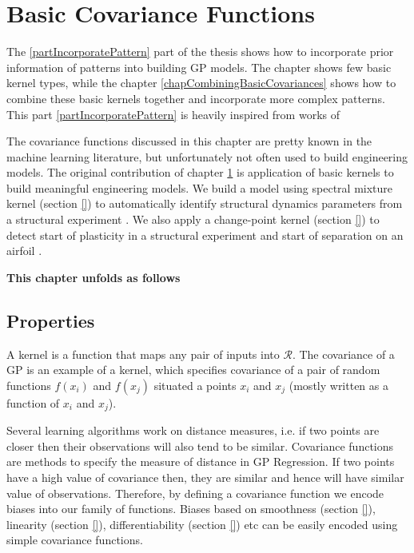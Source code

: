 \chapter{Basic Covariance Functions}
\label{chapBasicCovarianceKernels}
The \ref{partIncorporatePattern} part of the thesis shows how to incorporate prior information of patterns into building GP models. The chapter \cite{chapBasicCovarianceKernels} shows few basic kernel types, while the chapter \ref{chapCombiningBasicCovariances} shows how to combine these basic kernels together and incorporate more complex patterns. This part \ref{partIncorporatePattern} is heavily inspired from works of \cite{duvenaud-thesis-2014, wilson2014thesis, lloyd2014automatic, durrande2001etude} 

The covariance functions discussed in this chapter are pretty known in the machine learning literature, but unfortunately not often used to build engineering models. The original contribution of chapter \ref{chapBasicCovarianceKernels} is application of basic kernels to build meaningful engineering models. We build a model using spectral mixture kernel (section \ref{}) to automatically identify structural dynamics parameters from a structural experiment \cite{chiplunkar2017operational}. We also apply a change-point kernel (section \ref{}) to detect start of plasticity in a structural experiment and start of separation on an airfoil \cite{chiplunkar:hal-01555401}.  

\textbf{This chapter unfolds as follows}

\section{Properties}\label{secPropertiesOfCovariance}
A kernel is a function that maps any pair of inputs into \(\mathcal{R}\). The covariance of a GP is an example of a kernel, which specifies covariance of a pair of random functions \(f(x_{i})\) and \(f(x_{j})\) situated a points \(x_{i}\) and \(x_{j}\) (mostly written as a function of \(x_{i}\) and \(x_{j}\)). 

Several learning algorithms work on distance measures, i.e. if two points are closer then their observations will also tend to be similar. Covariance functions are methods to specify the measure of distance in GP Regression. If two points have a high value of covariance then, they are similar and hence will have similar value of observations. Therefore, by defining a covariance function we encode biases into our family of functions. Biases based on smoothness (section \ref{}), linearity (section \ref{}), differentiability (section \ref{}) etc can be easily encoded using simple covariance functions.

